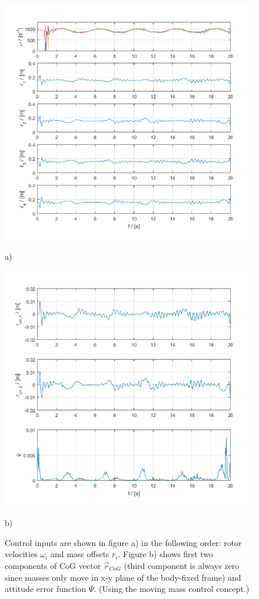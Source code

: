 \begin{figure}
	\centering
	\begin{minipage}{0.5\columnwidth}
		\centering
		\includegraphics[width=\columnwidth]{./pictures/mmc_traj_rotorVel_massOff.png}
		\caption*{a)}
		\label{fig:rotorVel_massOff}
	\end{minipage}%
	\begin{minipage}{0.5\columnwidth}
		\centering
		\includegraphics[width=\columnwidth]{./pictures/mmc_traj_rCm_attErr.png}
		\caption*{b)}
		\label{fig:rCm_attErr}
	\end{minipage}
	\caption{Control inputs are shown in figure a) in the following order: rotor velocities $\omega_i$ and mass offsets $r_i$. Figure b) shows first two components of CoG vector $\vec{r}_{CoG}$ (third component is always zero since masses only move in x-y plane of the body-fixed frame) and attitude error function $\Psi$. (Using the moving mass control concept.)}
\end{figure}

